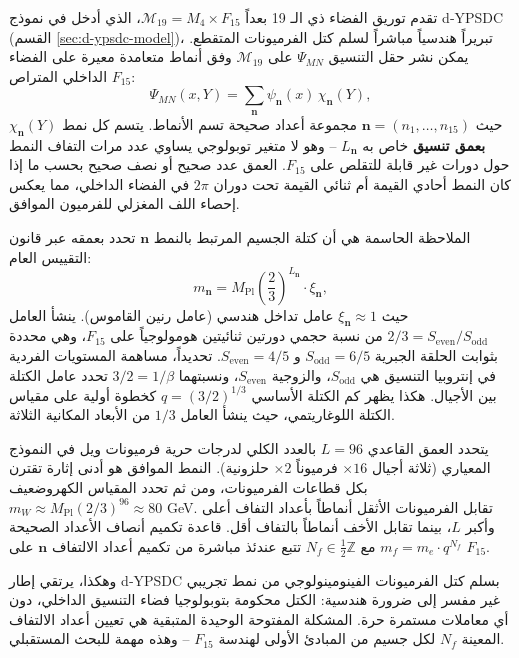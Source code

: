 \documentclass[12pt,a4paper]{article}
\begin{document}
	تقدم توريق الفضاء ذي الـ 19 بعداً \(\mathcal{M}_{19}=M_4\times F_{15}\)، الذي أدخل في نموذج d‑YPSDC (القسم \ref{sec:d-ypsdc-model})، تبريراً هندسياً مباشراً لسلم كتل الفرميونات المتقطع. يمكن نشر حقل التنسيق \(\Psi_{MN}\) على \(\mathcal{M}_{19}\) وفق أنماط متعامدة معيرة على الفضاء الداخلي المتراص \(F_{15}\):
	\begin{equation}
		\Psi_{MN}(x,Y) = \sum_{\mathbf{n}} \psi_{\mathbf{n}}(x)\, \chi_{\mathbf{n}}(Y),
		\label{eq:mode-exp}
	\end{equation}
	حيث \(\mathbf{n}=(n_1,\dots,n_{15})\) مجموعة أعداد صحيحة تسم الأنماط.
	يتسم كل نمط \(\chi_{\mathbf{n}}(Y)\) \textbf{بعمق تنسيق} خاص به \(L_{\mathbf{n}}\) – وهو لا متغير توبولوجي يساوي عدد مرات التفاف النمط حول دورات غير قابلة للتقلص على \(F_{15}\). العمق عدد صحيح أو نصف صحيح بحسب ما إذا كان النمط أحادي القيمة أم ثنائي القيمة تحت دوران \(2\pi\) في الفضاء الداخلي، مما يعكس إحصاء اللف المغزلي للفرميون الموافق.
	
	الملاحظة الحاسمة هي أن كتلة الجسيم المرتبط بالنمط \(\mathbf{n}\) تحدد بعمقه عبر قانون التقييس العام:
	\begin{equation}
		m_{\mathbf{n}} = M_{\mathrm{Pl}} \left( \frac{2}{3} \right)^{L_{\mathbf{n}}} \cdot \xi_{\mathbf{n}},
		\label{eq:mass-L}
	\end{equation}
	حيث \(\xi_{\mathbf{n}} \approx 1\) عامل تداخل هندسي (عامل رنين القاموس). ينشأ العامل \(2/3 = S_{\mathrm{even}}/S_{\mathrm{odd}}\) من نسبة حجمي دورتين ثنائيتين هومولوجياً على \(F_{15}\)، وهي محددة بثوابت الحلقة الجبرية \(S_{\mathrm{odd}}=6/5\) و \(S_{\mathrm{even}}=4/5\). تحديداً، مساهمة المستويات الفردية في إنتروبيا التنسيق هي \(S_{\mathrm{odd}}\)، والزوجية \(S_{\mathrm{even}}\)، ونسبتهما \(3/2 = 1/\beta\) تحدد عامل الكتلة بين الأجيال. هكذا يظهر كم الكتلة الأساسي \(q = (3/2)^{1/3}\) كخطوة أولية على مقياس الكتلة اللوغاريتمي، حيث ينشأ العامل \(1/3\) من الأبعاد المكانية الثلاثة.
	
	يتحدد العمق القاعدي \(L=96\) بالعدد الكلي لدرجات حرية فرميونات ويل في النموذج المعياري (ثلاثة أجيال \(\times 16\) فرميوناً \(\times 2\) حلزونية). النمط الموافق هو أدنى إثارة تقترن بكل قطاعات الفرميونات، ومن ثم تحدد المقياس الكهروضعيف \(m_W \approx M_{\mathrm{Pl}} (2/3)^{96} \approx 80\) GeV. تقابل الفرميونات الأثقل أنماطاً بأعداد التفاف أعلى وأكبر \(L\)، بينما تقابل الأخف أنماطاً بالتفاف أقل. قاعدة تكميم أنصاف الأعداد الصحيحة \(m_f = m_e \cdot q^{N_f}\) مع \(N_f \in \frac{1}{2}\mathbb{Z}\) تتبع عندئذ مباشرة من تكميم أعداد الالتفاف \(\mathbf{n}\) على \(F_{15}\).
	
	وهكذا، يرتقي إطار d‑YPSDC بسلم كتل الفرميونات الفينومينولوجي من نمط تجريبي غير مفسر إلى ضرورة هندسية: الكتل محكومة بتوبولوجيا فضاء التنسيق الداخلي، دون أي معاملات مستمرة حرة. المشكلة المفتوحة الوحيدة المتبقية هي تعيين أعداد الالتفاف المعينة \(N_f\) لكل جسيم من المبادئ الأولى لهندسة \(F_{15}\) – وهذه مهمة للبحث المستقبلي.
	
\end{document}
